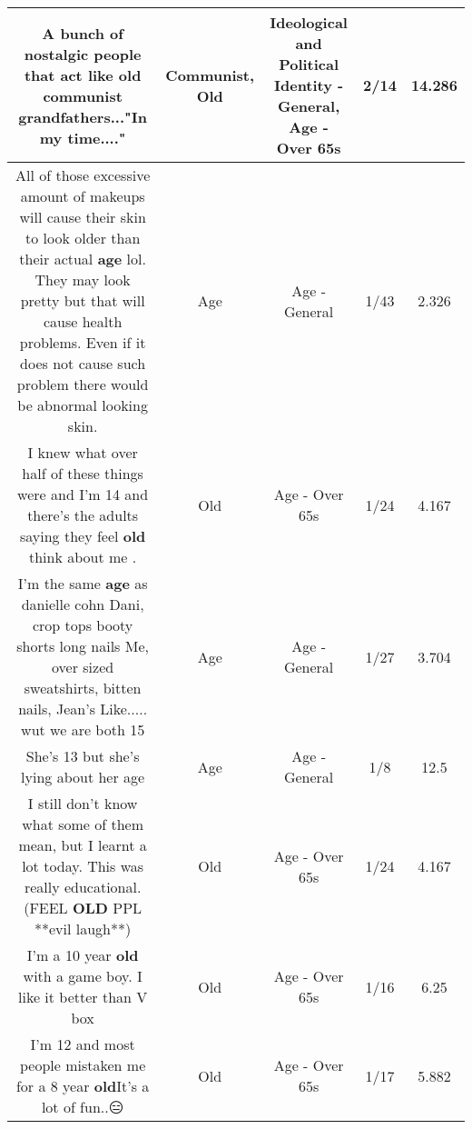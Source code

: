 \documentclass[11pt]{article}
\newlength\mylength
\begin{document}
\begin{center}
\begin{longtable}{|C{.65\mylength}|C{.30\mylength}|C{.12\mylength}|C{.12\mylength}|C{.12\mylength}|}
  \small A bunch of nostalgic people that act like \textbf{old} \textbf{communist} grandfathers..."In my time...."\normalsize   & Communist, Old &  Ideological and Political Identity - General, Age - Over 65s & 2/14 & 14.286 \\  \hline
  \small All of those excessive amount of makeups will cause their skin to look older than their actual \textbf{age} lol. They may look pretty but that will cause health problems. Even if it does not cause such problem there would be abnormal looking skin.\normalsize   & Age & Age - General & 1/43 & 2.326 \\  \hline
  \small I knew what over half of these things were and I'm 14 and there's the adults saying they feel \textbf{old} think about me .\normalsize   & Old & Age - Over 65s & 1/24 & 4.167 \\  \hline
  \small I'm the same \textbf{age} as danielle cohn Dani, crop tops booty shorts long nails Me, over sized sweatshirts, bitten nails, Jean's Like..... wut we are both 15\normalsize   & Age & Age - General & 1/27 & 3.704 \\  \hline
  \small She's 13 but she's lying about her age\normalsize   & Age & Age - General & 1/8 & 12.5 \\  \hline
  \small I still don't know what some of them mean, but I learnt a lot today. This was really educational. (FEEL \textbf{OLD} PPL **evil laugh**)\normalsize   & Old & Age - Over 65s & 1/24 & 4.167 \\  \hline
  \small I'm a 10 year \textbf{old} with a game boy. I like it better than V box\normalsize   & Old & Age - Over 65s & 1/16 & 6.25 \\  \hline
  \small I'm 12 and most people mistaken me for a 8 year \textbf{old}It's a lot of fun..😑\normalsize   & Old & Age - Over 65s & 1/17 & 5.882 \\  \hline

\end{longtable}
\end{center}
\end{document}
